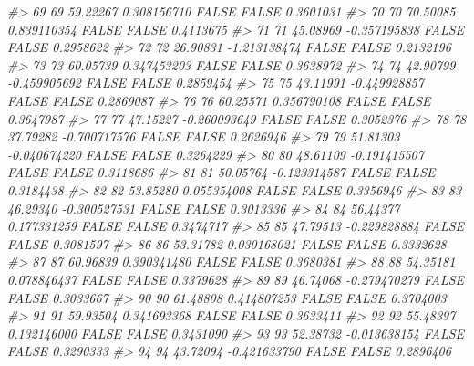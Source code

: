 \documentclass[
  oneside]{book}
\newenvironment{Shaded}{\begin{snugshade}}{\end{snugshade}}
\newcommand{\CommentTok}[1]{\textcolor[rgb]{0.56,0.35,0.01}{\textit{#1}}}
\begin{document}
\begin{Shaded}
\begin{Highlighting}[]
\CommentTok{\#\textgreater{} 69   69  59.22267  0.308156710     FALSE       FALSE        0.3601031}
\CommentTok{\#\textgreater{} 70   70  70.50085  0.839110354     FALSE       FALSE        0.4113675}
\CommentTok{\#\textgreater{} 71   71  45.08969 {-}0.357195838     FALSE       FALSE        0.2958622}
\CommentTok{\#\textgreater{} 72   72  26.90831 {-}1.213138474     FALSE       FALSE        0.2132196}
\CommentTok{\#\textgreater{} 73   73  60.05739  0.347453203     FALSE       FALSE        0.3638972}
\CommentTok{\#\textgreater{} 74   74  42.90799 {-}0.459905692     FALSE       FALSE        0.2859454}
\CommentTok{\#\textgreater{} 75   75  43.11991 {-}0.449928857     FALSE       FALSE        0.2869087}
\CommentTok{\#\textgreater{} 76   76  60.25571  0.356790108     FALSE       FALSE        0.3647987}
\CommentTok{\#\textgreater{} 77   77  47.15227 {-}0.260093649     FALSE       FALSE        0.3052376}
\CommentTok{\#\textgreater{} 78   78  37.79282 {-}0.700717576     FALSE       FALSE        0.2626946}
\CommentTok{\#\textgreater{} 79   79  51.81303 {-}0.040674220     FALSE       FALSE        0.3264229}
\CommentTok{\#\textgreater{} 80   80  48.61109 {-}0.191415507     FALSE       FALSE        0.3118686}
\CommentTok{\#\textgreater{} 81   81  50.05764 {-}0.123314587     FALSE       FALSE        0.3184438}
\CommentTok{\#\textgreater{} 82   82  53.85280  0.055354008     FALSE       FALSE        0.3356946}
\CommentTok{\#\textgreater{} 83   83  46.29340 {-}0.300527531     FALSE       FALSE        0.3013336}
\CommentTok{\#\textgreater{} 84   84  56.44377  0.177331259     FALSE       FALSE        0.3474717}
\CommentTok{\#\textgreater{} 85   85  47.79513 {-}0.229828884     FALSE       FALSE        0.3081597}
\CommentTok{\#\textgreater{} 86   86  53.31782  0.030168021     FALSE       FALSE        0.3332628}
\CommentTok{\#\textgreater{} 87   87  60.96839  0.390341480     FALSE       FALSE        0.3680381}
\CommentTok{\#\textgreater{} 88   88  54.35181  0.078846437     FALSE       FALSE        0.3379628}
\CommentTok{\#\textgreater{} 89   89  46.74068 {-}0.279470279     FALSE       FALSE        0.3033667}
\CommentTok{\#\textgreater{} 90   90  61.48808  0.414807253     FALSE       FALSE        0.3704003}
\CommentTok{\#\textgreater{} 91   91  59.93504  0.341693368     FALSE       FALSE        0.3633411}
\CommentTok{\#\textgreater{} 92   92  55.48397  0.132146000     FALSE       FALSE        0.3431090}
\CommentTok{\#\textgreater{} 93   93  52.38732 {-}0.013638154     FALSE       FALSE        0.3290333}
\CommentTok{\#\textgreater{} 94   94  43.72094 {-}0.421633790     FALSE       FALSE        0.2896406}

\end{Highlighting}
\end{Shaded}
\end{document}
